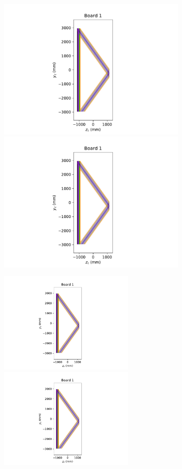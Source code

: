 \documentclass[pdftex,12pt,letter]{article}
\begin{document}
\begin{figure}[h]
  \includegraphics[height=7cm,page=9,clip, trim=5cm 0 5cm 0]{test_plot_board.pdf}%
  \includegraphics[height=7cm,page=10,clip, trim=5cm 0 5cm 0]{test_plot_board.pdf}%
  

  \includegraphics[height=5cm,page=3,clip,trim=7.1cm 9.4cm 8.1cm 2.25cm]{test_plot_board.pdf}%
  \includegraphics[height=5cm,page=3,clip,trim=6.8cm 8.6cm 9cm 3.1cm]{test_plot_board.pdf}


\end{figure}
\end{document}

